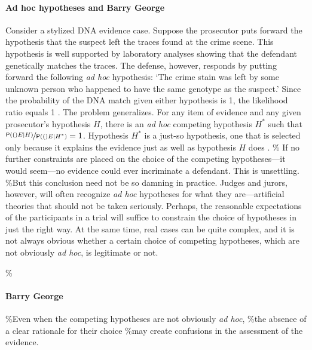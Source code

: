 \documentclass[10pt,dvipsnames,enabledeprecatedfontcommands]{scrartcl}
\let\oldparagraph\paragraph
\renewcommand{\paragraph}[1]{\oldparagraph{#1}\mbox{}}
\newcommand{\pr}[1]{\mathsf{P}(#1)}
\begin{document}
\paragraph{Ad hoc hypotheses and Barry George}

Consider a stylized DNA evidence case. Suppose the prosecutor puts
forward the hypothesis that the suspect left the traces found at the
crime scene. This hypothesis is well supported by laboratory analyses
showing that the defendant genetically matches the traces. The defense,
however, responds by putting forward the following \textit{ad hoc}
hypothesis: `The crime stain was left by some unknown person who
happened to have the same genotype as the suspect.' Since the
probability of the DNA match given either hypothesis is 1, the
likelihood ratio equals 1 \citep{evett2000MoreHierarchyPropositions}.
The problem generalizes. For any item of evidence and any given
prosecutor's hypothesis \(H\), there is an \textit{ad hoc} competing
hypothesis \(H^*\) such that
\(\nicefrac{\pr(E \vert H)}{\pr(E \vert H^*)}=1\). Hypothesis \(H^*\) is
a just-so hypothesis, one that is selected only because it explains the
evidence just as well as hypothesis \(H\) does \citep{mayo2018}. \% If
no further constraints are placed on the choice of the competing
hypotheses---it would seem---no evidence could ever incriminate a
defendant. This is unsettling. \%But this conclusion need not be so
damning in practice. Judges and jurors, however, will often recognize
\textit{ad hoc} hypotheses for what they are---artificial theories that
should not be taken seriously. Perhaps, the reasonable expectations of
the participants in a trial will suffice to constrain the choice of
hypotheses in just the right way. At the same time, real cases can be
quite complex, and it is not always obvious whether a certain choice of
competing hypotheses, which are not obviously \textit{ad hoc}, is
legitimate or not.

\%\paragraph{Barry George}

\%Even when the competing hypotheses are not obviously \textit{ad hoc},
\%the absence of a clear rationale for their choice \%may create
confusions in the assessment of the evidence.
\end{document}
